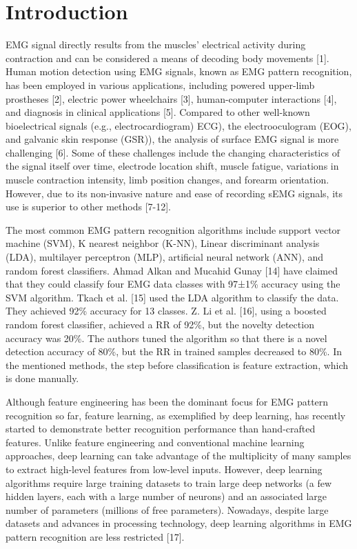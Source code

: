 
\section{Introduction}
 EMG signal directly results from the muscles' electrical activity during contraction and can be considered a means of decoding body movements [1]. Human motion detection using EMG signals, known as EMG pattern recognition, has been employed in various applications, including powered upper-limb prostheses [2], electric power wheelchairs [3], human-computer interactions [4], and diagnosis in clinical applications [5]. Compared to other well-known bioelectrical signals (e.g., electrocardiogram) ECG), the electrooculogram (EOG), and galvanic skin response (GSR)), the analysis of surface EMG signal is more challenging [6]. Some of these challenges include the changing characteristics of the signal itself over time, electrode location shift, muscle fatigue, variations in muscle contraction intensity, limb position changes, and forearm orientation. However, due to its non-invasive nature and ease of recording sEMG signals, its use is superior to other methods [7-12].

The most common EMG pattern recognition algorithms include support vector machine (SVM), K nearest neighbor (K-NN), Linear discriminant analysis (LDA), multilayer perceptron (MLP), artificial neural network (ANN), and random forest classifiers. Ahmad Alkan and Mucahid Gunay [14] have claimed that they could classify four EMG data classes with 97±1\% accuracy using the SVM algorithm. Tkach et al. [15] used the LDA algorithm to classify the data. They achieved 92\% accuracy for 13 classes. Z. Li et al. [16], using a boosted random forest classifier, achieved a RR of 92\%, but the novelty detection accuracy was 20\%. The authors tuned the algorithm so that there is a novel detection accuracy of 80\%, but the RR in trained samples decreased to 80\%. In the mentioned methods, the step before classification is feature extraction, which is done manually.

Although feature engineering has been the dominant focus for EMG pattern recognition so far, feature learning, as exemplified by deep learning, has recently started to demonstrate better recognition performance than hand-crafted features. Unlike feature engineering and conventional machine learning approaches, deep learning can take advantage of the multiplicity of many samples to extract high-level features from low-level inputs. However, deep learning algorithms require large training datasets to train large deep networks (a few hidden layers, each with a large number of neurons) and an associated large number of parameters (millions of free parameters). Nowadays, despite large datasets and advances in processing technology, deep learning algorithms in EMG pattern recognition are less restricted [17].

